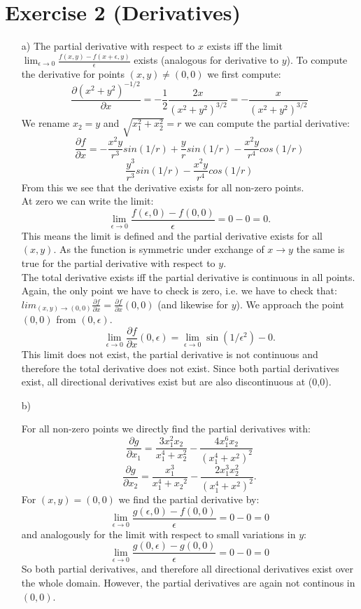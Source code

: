 \documentclass[10pt]{article}
\numberwithin{equation}{section}
\begin{document}
\section*{Exercise 2 (Derivatives)}

\begin{enumerate}
\item[a)]{
The partial derivative with respect to $x$ exists iff the limit $\lim_{\epsilon \to 0} \frac{f(x, y) - f(x+\epsilon, y)}{\epsilon}$ exists (analogous  for derivative to $y$).  
To compute the derivative for points $(x, y) \neq (0, 0)$ we first compute:
$$
\frac{\partial \left(x^2 + y^2\right)^{-1/2}}{\partial x}  = -\frac{1}{2} \frac{2x}{\left(x^2 + y^2\right)^{3/2}} = -\frac{x}{\left(x^2 + y^2\right)^{3/2}}
$$
We rename $x_2 = y$ and $\sqrt{x_1^2 + x_2^2} = r$ we can compute the partial derivative: 
$$
\frac{\partial f}{\partial x} = -\frac{x^2y}{r^3}sin(1/r) + \frac{y}{r}sin(1/r) -\frac{x^2y}{r^4} cos(1/r)
$$
$$
\frac{y^3}{r^3} sin(1/r) -\frac{x^2y}{r^4} cos(1/r)
$$
From this we see that the derivative exists for all non-zero points. \\
At zero we can write the limit:
$$
\lim_{\epsilon \to 0} \frac{f(\epsilon, 0) - f(0, 0)} {\epsilon} = 0 - 0 = 0.
$$
This means the limit is defined and the partial derivative exists for all $(x, y)$. 
As the function is symmetric under exchange of $x \to y$ the same is true for the partial derivative with respect to $y$.\\
The total derivative exists iff the partial derivative is continuous in all points. Again, the only point we have to check is zero, i.e. we have to check that:
$lim_{(x, y) \to (0, 0)} \frac{\partial f}{\partial x} = \frac{\partial f}{\partial x} (0, 0)$ (and likewise for $y$).
We approach the point $(0, 0)$ from $(0, \epsilon)$. 
$$
\lim_{\epsilon \to 0} \frac{\partial f}{\partial x}( 0, \epsilon) = \lim_{\epsilon \to 0} \sin(1/\epsilon^2) - 0.
$$
This limit does not exist, the partial derivative is not continuous and therefore the total derivative does not exist.
Since both partial derivatives exist, all directional derivatives exist but are also discontinuous at (0,0).}
\item[b)]{
For all non-zero points we directly find the partial derivatives with:
$$
\frac{\partial g}{ \partial x_1} = \frac{3x_1^2x_2}{x_1^4+x_2^2} - \frac{4x_1^6x_2}{(x_1^4 + x^2)^2}
$$
$$
\frac{\partial g}{ \partial x_2} = \frac{x_1^3}{x_1^4+{x_2}^2} - \frac{2x_1^3x_2^2}{(x_1^4 + x^2)^2}. 
$$
For $(x, y)= (0, 0)$ we find the partial derivative by: 
$$
\lim_{\epsilon \to 0} \frac{g(\epsilon, 0) - f(0, 0)} {\epsilon} = 0 - 0 = 0
$$
and analogously for the limit with respect to small variations in $y$:
$$
\lim_{\epsilon \to 0} \frac{g(0, \epsilon) - g(0, 0)} {\epsilon} = 0 - 0 = 0
$$
So both partial derivatives, and therefore all directional derivatives exist over the whole domain.
However, the partial derivatives are again not continous in $(0, 0)$. 

}
\end{enumerate}
\end{document}
